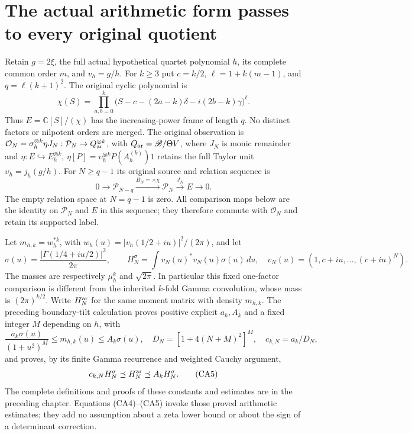 \section{The actual arithmetic form passes to every original quotient}

Retain $g=2\xi$, the full actual hypothetical quartet polynomial $h$,
its complete common order $m$, and $v_h=g/h$.  For $k\ge3$ put
$c=k/2$, $\ell=1+k(m-1)$, and $q=\ell(k+1)^2$.  The original
cyclic polynomial is
\[
 \chi(S)=\prod_{a,b=0}^{k}
 \bigl(S-c-(2a-k)\delta-i(2b-k)\gamma\bigr)^\ell.
 \tag{CA1}
\]
Thus $E=\mathbb C[S]/(\chi)$ has the increasing-power frame of length
$q$.  No distinct factors or nilpotent orders are merged.  The original
observation is $\mathcal O_N=\sigma_h^{\otimes k}\eta J_N:
\mathcal P_N\to Q_{\rm ar}^{\otimes k}$, with
$Q_{\rm ar}=\mathscr B/\Theta V$, where
$J_N$ is monic remainder and $\eta:E\hookrightarrow E_h^{\otimes k}$,
$\eta[P]=\upsilon_h^{\otimes k}
P(A_h^{(k)})1$ retains the full Taylor unit
$\upsilon_h=j_h(g/h)$.  For $N\ge q-1$ its original source and relation
sequence is
\[
 0\longrightarrow\mathcal P_{N-q}\xrightarrow{B_N=\times\chi}
 \mathcal P_N\xrightarrow{J_N}E\longrightarrow0.
 \tag{CA2}
\]
The empty relation space at $N=q-1$ is zero.  All comparison maps below
are the identity on $\mathcal P_N$ and $E$ in this sequence; they
therefore commute with $\mathcal O_N$ and retain its supported label.

Let $m_{h,k}=w_h^{*k}$, with
$w_h(u)=|v_h(1/2+iu)|^2/(2\pi)$, and let
\[
 \sigma(u)=\frac{|\Gamma(1/4+iu/2)|^2}{2\pi},\qquad
 H_N^\sigma=\int v_N(u)^*v_N(u)\sigma(u)\,du,
 \quad v_N(u)=(1,c+iu,\ldots,(c+iu)^N).
 \tag{CA3}
\]
The masses are respectively $\mu_h^k$ and $\sqrt{2\pi}$.
In particular this fixed one-factor comparison is different from the
inherited $k$-fold Gamma convolution, whose mass is $(2\pi)^{k/2}$.
Write $H_N^{\rm ar}$ for the same moment matrix with density $m_{h,k}$.
The preceding boundary-tilt calculation proves positive explicit
$a_k,A_k$ and a fixed integer $M$ depending on $h$, with
\[
 \frac{a_k\sigma(u)}{(1+u^2)^M}\le m_{h,k}(u)\le A_k\sigma(u),
 \quad D_N=[1+4(N+M)^2]^M,
 \quad c_{k,N}=a_k/D_N,
 \tag{CA4}
\]
and proves, by its finite Gamma recurrence and weighted Cauchy argument,
\[
 c_{k,N}H_N^\sigma\preceq H_N^{\rm ar}\preceq A_kH_N^\sigma.
 \tag{CA5}
\]
The complete definitions and proofs of these constants and estimates
are in the preceding chapter.  Equations (CA4)--(CA5) invoke those
proved arithmetic estimates; they add no assumption about a zeta
lower bound or about the sign of a determinant correction.

